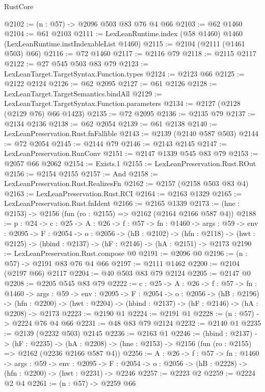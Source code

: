 \begin{lexlean}{RustCore}
\begin{coremodule}
@2102 := (n : @57) -> @2096 @503 @83 @76 @4 @66
@2103 := @62 @1460
@2104 := @61 @2103
@2111 := LexLeanRuntime.index (@58 @1460) @1460 (LexLeanRuntime.instIndexableList @1460)
@2115 := @2104 (@2111 (@1461 @503) @66)
@2116 := @72 @1460
@2117 := @2116 @79
@2118 := @2115 @2117
@2122 := @27 @545 @503 @83 @79
@2123 := LexLeanTarget.TargetSyntax.Function.types
@2124 := @2123 @66
@2125 := @2122 @2124
@2126 := @62 @2095
@2127 := @61 @2126
@2128 := LexLeanTarget.TargetSemantics.bindAll
@2129 := LexLeanTarget.TargetSyntax.Function.parameters
@2134 := @2127 (@2128 (@2129 @76) @66 @1423)
@2135 := @72 @2095
@2136 := @2135 @79
@2137 := @2134 @2136
@2138 := @62 @2054
@2139 := @61 @2138
@2140 := LexLeanPreservation.Rust.fnFallible
@2143 := @2139 (@2140 @587 @503)
@2144 := @72 @2054
@2145 := @2144 @79
@2146 := @2143 @2145
@2147 := LexLeanPreservation.RunConv
@2151 := @2147 @1339 @545 @83 @79
@2153 := @2057 @66 @2062
@2154 := Exists.{1}
@2155 := LexLeanPreservation.Rust.ROut
@2156 := @2154 @2155
@2157 := And
@2158 := LexLeanPreservation.Rust.RealizesFn
@2162 := @2157 (@2158 @503 @83 @4)
@2163 := LexLeanPreservation.Rust.RCI
@2164 := @2163 @1329
@2165 := LexLeanPreservation.Rust.fnIdent
@2166 := @2165 @1339
@2173 := (hne : @2153) -> @2156 (fun (ro : @2155) => @2162 (@2164 @2166 @587 @4))
@2188 := {p : @24} ->
  {c : @25} ->
  {A : @26} ->
  {f : @57} ->
  {fn : @1460} ->
  {args : @59} ->
  {env : @2095} ->
  {F : @2054} ->
  {o : @2056} ->
  (hB : @2102) ->
  (hfn : @2118) -> (hwt : @2125) -> (hbind : @2137) -> (hF : @2146) -> (hA : @2151) -> @2173
@2190 := LexLeanPreservation.Rust.compose @0
@2191 := @2096 @0
@2196 := (n : @57) -> @2191 @83 @76 @4 @66
@2197 := @2111 @1462
@2200 := @2104 (@2197 @66) @2117
@2204 := @40 @503 @83 @79 @2124
@2205 := @2147 @0
@2208 := @2205 @545 @83 @79
@2222 := {c : @25} ->
  {A : @26} ->
  {f : @57} ->
  {fn : @1460} ->
  {args : @59} ->
  {env : @2095} ->
  {F : @2054} ->
  {o : @2056} ->
  (hB : @2196) ->
  (hfn : @2200) -> (hwt : @2204) -> (hbind : @2137) -> (hF : @2146) -> (hA : @2208) -> @2173
@2223 := @2190 @1
@2224 := @2191 @1
@2228 := (n : @57) -> @2224 @76 @4 @66
@2231 := @48 @83 @79 @2124
@2232 := @2140 @1
@2235 := @2139 (@2232 @503) @2145
@2236 := @2163 @1
@2246 := (hbind : @2137) ->
  (hF : @2235) ->
  (hA : @2208) -> (hne : @2153) -> @2156 (fun (ro : @2155) => @2162 (@2236 @2166 @587 @4))
@2256 := {A : @26} ->
  {f : @57} ->
  {fn : @1460} ->
  {args : @59} ->
  {env : @2095} ->
  {F : @2054} -> {o : @2056} -> (hB : @2228) -> (hfn : @2200) -> (hwt : @2231) -> @2246
@2257 := @2223 @2
@2259 := @2224 @2 @4
@2261 := (n : @57) -> @2259 @66

\end{coremodule}
\end{lexlean}
